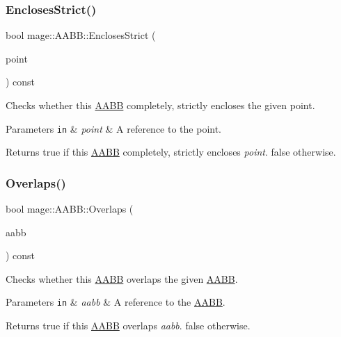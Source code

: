 \subsubsection{\texorpdfstring{Encloses\+Strict()}{EnclosesStrict()}\hspace{0.1cm}{\footnotesize\ttfamily [2/2]}}
{\footnotesize\ttfamily bool mage\+::\+A\+A\+B\+B\+::\+Encloses\+Strict (\begin{DoxyParamCaption}\item[{const \hyperlink{structmage_1_1_point3}{Point3} \&}]{point }\end{DoxyParamCaption}) const}

Checks whether this \hyperlink{structmage_1_1_a_a_b_b}{A\+A\+BB} completely, strictly encloses the given point.


\begin{DoxyParams}[1]{Parameters}
\mbox{\tt in}  & {\em point} & A reference to the point. \\
\hline
\end{DoxyParams}
\begin{DoxyReturn}{Returns}
{\ttfamily true} if this \hyperlink{structmage_1_1_a_a_b_b}{A\+A\+BB} completely, strictly encloses {\itshape point}. {\ttfamily false} otherwise. 
\end{DoxyReturn}
\hypertarget{structmage_1_1_a_a_b_b_a5a959edc3bc5ccdd29025d612c2e66e3}{}\label{structmage_1_1_a_a_b_b_a5a959edc3bc5ccdd29025d612c2e66e3} 
\subsubsection{\texorpdfstring{Overlaps()}{Overlaps()}}
{\footnotesize\ttfamily bool mage\+::\+A\+A\+B\+B\+::\+Overlaps (\begin{DoxyParamCaption}\item[{const \hyperlink{structmage_1_1_a_a_b_b}{A\+A\+BB} \&}]{aabb }\end{DoxyParamCaption}) const}

Checks whether this \hyperlink{structmage_1_1_a_a_b_b}{A\+A\+BB} overlaps the given \hyperlink{structmage_1_1_a_a_b_b}{A\+A\+BB}.


\begin{DoxyParams}[1]{Parameters}
\mbox{\tt in}  & {\em aabb} & A reference to the \hyperlink{structmage_1_1_a_a_b_b}{A\+A\+BB}. \\
\hline
\end{DoxyParams}
\begin{DoxyReturn}{Returns}
{\ttfamily true} if this \hyperlink{structmage_1_1_a_a_b_b}{A\+A\+BB} overlaps {\itshape aabb}. {\ttfamily false} otherwise. 
\end{DoxyReturn}
\hypertarget{structmage_1_1_a_a_b_b_ae8e6eca9c5e30015a91ab2e900594bfc}{}\label{structmage_1_1_a_a_b_b_ae8e6eca9c5e30015a91ab2e900594bfc} 
